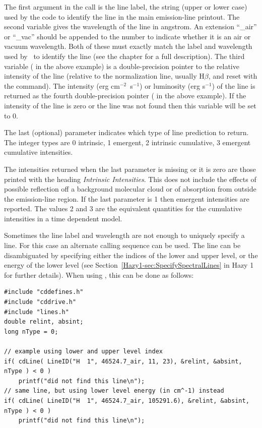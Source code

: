 The first argument in the call is the line label, the
string (upper or lower case) used by the code to identify
the line in the main emission-line printout.  The second variable gives
the wavelength of the line in angstrom. An extension ``\_air'' or ``\_vac''
should be appended to the number to indicate whether it is an air or vacuum
wavelength. Both of these must exactly match
the label and wavelength used by \Cloudy\ to identify the line
(see the chapter  for a full description).
The third variable ( in the above
example) is a double-precision pointer to the relative intensity of the
line (relative to the normalization line, usually H$\beta$,
and reset with the
 command).
The intensity (erg cm$^{-2}$~s$^{-1}$) or luminosity (erg s$^{-1}$)
of the line is returned as the fourth double-precision pointer
( in the above example).
If the intensity of the line is zero or
the line was not found then this variable will be set to 0.

The last (optional) parameter indicates which type of line prediction to return.
The integer types are
 0 intrinsic, 
 1 emergent, 
 2 intrinsic cumulative, 
 3 emergent cumulative
 intensities.

The intensities returned when the last parameter is missing
or it is zero are those printed with the
heading \emph{Intrinsic Intensities}.
This does not include the effects of possible
reflection off a background molecular cloud or of absorption from outside
the emission-line region.
If the last parameter is 1 then emergent
intensities are reported.
The values 2 and 3 are the equivalent quantities for the cumulative
intensities in a time dependent model.

Sometimes the line label and wavelength are not enough to uniquely specify a
line. For this case an alternate calling sequence can be used. The line can be
disambiguated by specifying either the indices of the lower and upper level,
or the energy of the lower level (see Section~\ref{Hazy1-sec:SpecifySpectralLines}
in Hazy 1 for further details). When using , this can be done as
follows:
\begin{verbatim}
#include "cddefines.h"
#include "cddrive.h"
#include "lines.h"
double relint, absint;
long nType = 0;

// example using lower and upper level index
if( cdLine( LineID("H  1", 46524.7_air, 11, 23), &relint, &absint, nType ) < 0 )
    printf("did not find this line\n");
// same line, but using lower level energy (in cm^-1) instead
if( cdLine( LineID("H  1", 46524.7_air, 105291.6), &relint, &absint, nType ) < 0 )
    printf("did not find this line\n");
\end{verbatim}

